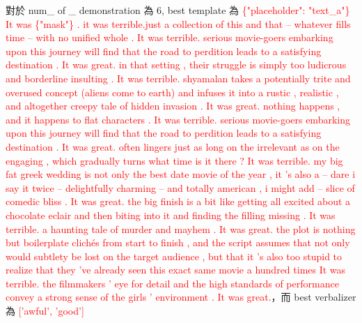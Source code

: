 \documentclass[a4paper,12pt]{article}   %
\newcommand{\xq}[1]{\textcolor{red}{#1}}
\begin{document}
對於 num\_ of \_ demonstration 為 6, best template 為 \xq{\{"placeholder": "text\_a"\} It was \{"mask"\} . it was terrible.just a collection of this and that -- whatever fills time -- with no unified whole . It was terrible. serious movie-goers embarking upon this journey will find that the road to perdition leads to a satisfying destination . It was great. in that setting , their struggle is simply too ludicrous and borderline insulting . It was terrible. shyamalan takes a potentially trite and overused concept (aliens come to earth) and infuses it into a rustic , realistic , and altogether creepy tale of hidden invasion . It was great. nothing happens , and it happens to flat characters . It was terrible. serious movie-goers embarking upon this journey will find that the road to perdition leads to a satisfying destination . It was great. often lingers just as long on the irrelevant as on the engaging , which gradually turns what time is it there ? It was terrible. my big fat greek wedding is not only the best date movie of the year , it 's also a -- dare i say it twice -- delightfully charming -- and totally american , i might add -- slice of comedic bliss . It was great. the big finish is a bit like getting all excited about a chocolate eclair and then biting into it and finding the filling missing . It was terrible. a haunting tale of murder and mayhem . It was great. the plot is nothing but boilerplate clichés from start to finish , and the script assumes that not only would subtlety be lost on the target audience , but that it 's also too stupid to realize that they 've already seen this exact same movie a hundred times It was terrible. the filmmakers ' eye for detail and the high standards of performance convey a strong sense of the girls ' environment . It was great.}，而 best verbalizer 為 \xq{['awful', 'good']} 
\end{document}
